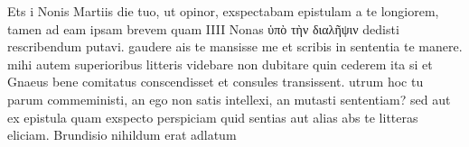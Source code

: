 


 Ets i Nonis Martiis die tuo, ut opinor, exspectabam epistulam a te longiorem, tamen ad eam ipsam brevem quam IIII Nonas ὑπὸ τὴν διαλῆψιν dedisti rescribendum putavi. gaudere ais te mansisse me et scribis in sententia te manere. mihi autem superioribus litteris videbare non dubitare quin cederem ita si et Gnaeus bene comitatus conscendisset et consules transissent. utrum hoc tu parum commeministi, an ego non satis intellexi, an mutasti sententiam? sed aut ex epistula quam exspecto perspiciam quid sentias aut alias abs te litteras eliciam. Brundisio nihildum erat adlatum
